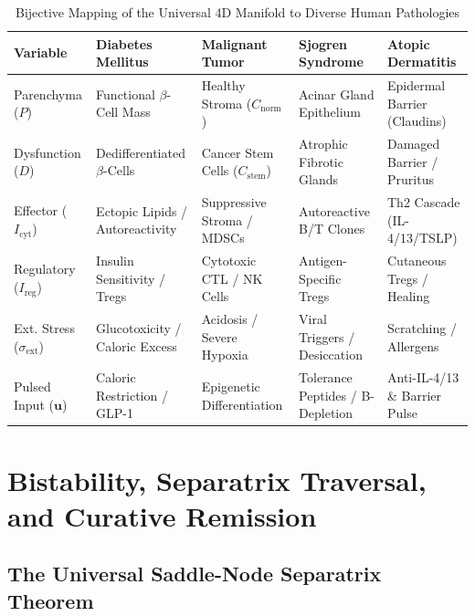\documentclass[11pt,a4paper]{article}
\begin{document}
\begin{table}[H]
\centering
\small
\caption{Bijective Mapping of the Universal 4D Manifold to Diverse Human Pathologies}
\begin{tabular}{lllll}
\toprule
\textbf{Variable} & \textbf{Diabetes Mellitus} & \textbf{Malignant Tumor} & \textbf{Sjogren Syndrome} & \textbf{Atopic Dermatitis} \\
\midrule
Parenchyma ($P$) & Functional $\beta$-Cell Mass & Healthy Stroma ($C_{\mathrm{norm}}$) & Acinar Gland Epithelium & Epidermal Barrier (Claudins) \\
Dysfunction ($D$) & Dedifferentiated $\beta$-Cells & Cancer Stem Cells ($C_{\mathrm{stem}}$) & Atrophic Fibrotic Glands & Damaged Barrier / Pruritus \\
Effector ($I_{\mathrm{cyt}}$) & Ectopic Lipids / Autoreactivity & Suppressive Stroma / MDSCs & Autoreactive B/T Clones & Th2 Cascade (IL-4/13/TSLP) \\
Regulatory ($I_{\mathrm{reg}}$) & Insulin Sensitivity / Tregs & Cytotoxic CTL / NK Cells & Antigen-Specific Tregs & Cutaneous Tregs / Healing \\
Ext. Stress ($\sigma_{\mathrm{ext}}$) & Glucotoxicity / Caloric Excess & Acidosis / Severe Hypoxia & Viral Triggers / Desiccation & Scratching / Allergens \\
Pulsed Input ($\bm{u}$) & Caloric Restriction / GLP-1 & Epigenetic Differentiation & Tolerance Peptides / B-Depletion & Anti-IL-4/13 \& Barrier Pulse \\
\bottomrule
\end{tabular}
\end{table}

\section{Bistability, Separatrix Traversal, and Curative Remission}

\subsection{The Universal Saddle-Node Separatrix Theorem}
\end{document}
